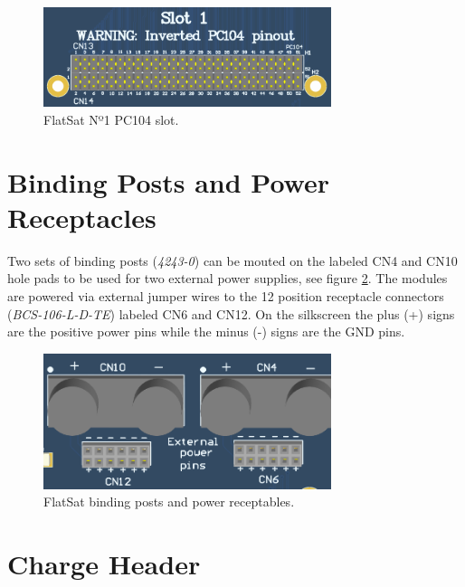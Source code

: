 \begin{figure}[!ht]
    \begin{center}
        \includegraphics[width=0.75\textwidth]{figures/pc104_slot_n1.png}
        \caption{FlatSat Nº1 PC104 slot.}
        \label{fig:n1-slot}
    \end{center}
\end{figure}

\section{Binding Posts and Power Receptacles}

Two sets of binding posts (\textit{4243-0}) can be mouted on the labeled CN4 and CN10 hole pads to be used for two external power supplies, see figure \ref{fig:binding-posts}. The modules are powered via external jumper wires to the 12 position receptacle connectors (\textit{BCS-106-L-D-TE}) labeled CN6 and CN12. On the silkscreen the plus (+) signs are the positive power pins while the minus (-) signs are the GND pins.

\begin{figure}[!ht]
    \begin{center}
        \includegraphics[width=0.75\textwidth]{figures/binding_posts.png}
        \caption{FlatSat binding posts and power receptables.}
        \label{fig:binding-posts}
    \end{center}
\end{figure}

\section{Charge Header}

